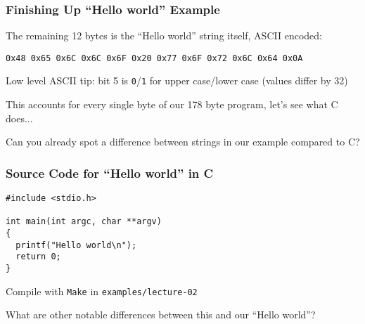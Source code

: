   \begin{frame}
    \frametitle{Finishing Up ``Hello world'' Example}

    The remaining 12 bytes is the ``Hello world'' string itself, ASCII encoded:
    
    \texttt{\footnotesize 0x48 0x65 0x6C 0x6C 0x6F 0x20 0x77 0x6F 0x72 0x6C 0x64 0x0A}

    \vspace{2em}

    \hspace{2em} Low level ASCII tip: bit 5 is \texttt{0}/\texttt{1} for upper
    case/lower case (values differ by 32)

    \vspace{2em}

    This accounts for every single byte of our 178 byte program, let's see what
    C does...

    \vspace{2em}
    Can you already spot a difference between strings in our example compared to
    C?
  \end{frame}

  \begin{frame}[fragile]
    \frametitle{Source Code for ``Hello world'' in C}

    \begin{lstlisting}
#include <stdio.h>

int main(int argc, char **argv)
{
  printf("Hello world\n");
  return 0;
}
    \end{lstlisting}

    Compile with \lstinline|Make| in \lstinline|examples/lecture-02|

    \vspace{2em}

    What are other notable differences between this and our ``Hello world''?
  \end{frame}

